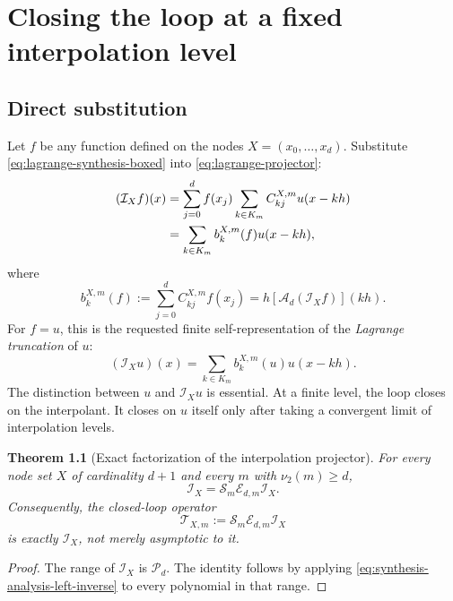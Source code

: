 \documentclass[11pt,oneside]{book}
\newtheorem{theorem}{Theorem}[chapter]
\theoremstyle{definition}
\theoremstyle{remark}
\newcommand{\Pp}{\mathcal P}
\newcommand{\Iop}{\mathcal I}
\newcommand{\Aop}{\mathcal A}
\newcommand{\Sop}{\mathcal S}
\newcommand{\Eop}{\mathcal E}
\newcommand{\Top}{\mathcal T}
\newcommand{\vtwo}{\nu_2}
\begin{document}
\chapter{Closing the loop at a fixed interpolation level}
\label{ch:fixed-loop}

\section{Direct substitution}
Let \(f\) be any function defined on the nodes \(X=(x_0,\ldots,x_d)\).  Substitute \cref{eq:lagrange-synthesis-boxed} into \cref{eq:lagrange-projector}:
\begin{align}
 (\Iop_Xf)(x)
 &=\sum_{j=0}^{d}f(x_j)\sum_{k\in K_m}C_{kj}^{X,m}u(x-kh)\notag\\
 &=\sum_{k\in K_m}b_k^{X,m}(f)u(x-kh),
 \label{eq:fixed-loop-substitution}
\end{align}
where
\begin{equation}
 b_k^{X,m}(f)
 :=\sum_{j=0}^{d}C_{kj}^{X,m}f(x_j)
 =h\left[\Aop_d(\Iop_Xf)\right](kh).
 \label{eq:fixed-loop-coefficients}
\end{equation}
For \(f=u\), this is the requested finite self-representation of the \emph{Lagrange truncation} of \(u\):
\begin{equation}
 (\Iop_Xu)(x)
 =\sum_{k\in K_m}b_k^{X,m}(u)u(x-kh).
 \label{eq:up-interpolant-self-representation}
\end{equation}
The distinction between \(u\) and \(\Iop_Xu\) is essential.  At a finite level, the loop closes on the interpolant.  It closes on \(u\) itself only after taking a convergent limit of interpolation levels.

\begin{theorem}[Exact factorization of the interpolation projector]
\label{thm:interpolation-factorization}
For every node set \(X\) of cardinality \(d+1\) and every \(m\) with \(\vtwo(m)\ge d\),
\begin{equation}
 \boxed{\Iop_X=\Sop_m\Eop_{d,m}\Iop_X.}
 \label{eq:interpolation-factorization}
\end{equation}
Consequently, the closed-loop operator
\begin{equation}
 \Top_{X,m}:=\Sop_m\Eop_{d,m}\Iop_X
 \label{eq:closed-loop-operator}
\end{equation}
is exactly \(\Iop_X\), not merely asymptotic to it.
\end{theorem}

\begin{proof}
The range of \(\Iop_X\) is \(\Pp_d\).  The identity follows by applying \cref{eq:synthesis-analysis-left-inverse} to every polynomial in that range.
\end{proof}
\end{document}
